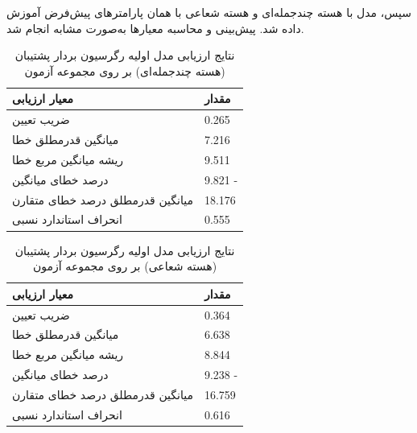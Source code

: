 سپس، مدل با هسته چندجمله‌ای و هسته شعاعی با همان پارامترهای پیش‌فرض آموزش داده شد. پیش‌بینی و محاسبه معیارها به‌صورت مشابه انجام شد.

\vspace{0.3cm}
\begin{table}[H]
	\centering
	\caption{نتایج ارزیابی مدل اولیه رگرسیون بردار پشتیبان (هسته چندجمله‌ای) بر روی مجموعه آزمون}
	\renewcommand{\arraystretch}{1.3}
	\begin{tabular}{
			>{\centering\arraybackslash}m{4cm}
			>{\centering\arraybackslash}m{3cm}
		}
		\toprule
		\textbf{معیار ارزیابی} & \textbf{مقدار} \\
		\midrule
		ضریب تعیین & \num{0.265} \\
		میانگین قدرمطلق خطا & \num{7.216} \\
		ریشه میانگین مربع خطا & \num{9.511} \\
		درصد خطای میانگین\ & \num{9.821} - \\
		میانگین قدرمطلق درصد خطای متقارن & \num{18.176} \\
		انحراف استاندارد نسبی & \num{0.555} \\
		\bottomrule
	\end{tabular}
	\label{tab:svr_initial_poly}
\end{table}
\vspace{0.3cm}

\begin{table}[H]
	\centering
	\caption{نتایج ارزیابی مدل اولیه رگرسیون بردار پشتیبان (هسته شعاعی) بر روی مجموعه آزمون}
	\renewcommand{\arraystretch}{1.3}
	\begin{tabular}{
			>{\centering\arraybackslash}m{4cm}
			>{\centering\arraybackslash}m{3cm}
		}
		\toprule
		\textbf{معیار ارزیابی} & \textbf{مقدار} \\
		\midrule
		ضریب تعیین & \num{0.364} \\
		میانگین قدرمطلق خطا & \num{6.638} \\
		ریشه میانگین مربع خطا & \num{8.844} \\
		درصد خطای میانگین & \num{9.238} - \\
		میانگین قدرمطلق درصد خطای متقارن & \num{16.759} \\
		انحراف استاندارد نسبی & \num{0.616} \\
		\bottomrule
	\end{tabular}
	\label{tab:svr_initial_rbf}
\end{table}
\vspace{0.5cm}

